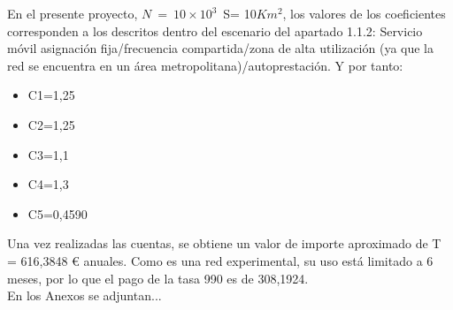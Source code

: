 En el presente proyecto, $N\ =\ 10 \times 10^3$\, S= 10$Km^2$, los valores de los coeficientes corresponden a los descritos dentro del escenario del apartado 1.1.2: Servicio móvil asignación fija/frecuencia compartida/zona de alta utilización (ya que la red se encuentra en un área metropolitana)/autoprestación. Y por tanto: 
\begin{itemize}
\item C1=1,25
\item C2=1,25
\item C3=1,1
\item C4=1,3
\item C5=0,4590
\end{itemize}

Una vez realizadas las cuentas, se obtiene un valor de importe aproximado de T = 616,3848 \euro{} anuales. Como es una red experimental, su uso está limitado a 6 meses, por lo que el pago de la tasa 990 es de 308,1924. \\

En los Anexos se adjuntan...
